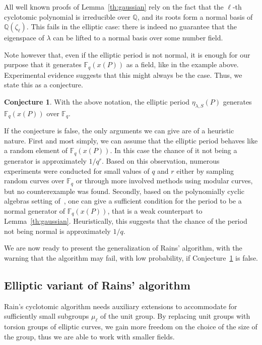 \documentclass{mcom-l}
\theoremstyle{plain}
\theoremstyle{definition}
\newtheorem{conjecture}[theorem]{Conjecture}
\newcommand{\Q}{\ensuremath{\mathbb{Q}}}
\newcommand{\F}{\ensuremath{\mathbb{F}}}
\newcounter{algorithm}
\begin{document}
All well known proofs of Lemma~\ref{th:gaussian} rely on the fact that
the $\ell$-th cyclotomic polynomial is irreducible over $\Q$, and its
roots form a normal basis of $\Q(\zeta_\ell)$. %
This fails in the elliptic case: there is indeed no guarantee that the
eigenspace of $\lambda$ can be lifted to a normal basis over some
number field.

Note however that, even if the elliptic period is not normal, it is
enough for our purpose that it generates $\F_q(x(P))$ as a field, like
in the example above.
Experimental evidence suggests that this might always be the
case.
Thus, we state this as a conjecture.

\begin{conjecture}
\label{conj:ellperiods}
With the above notation, the elliptic period $\eta_{\lambda,S}(P)$
generates $\F_q(x(P))$ over $\F_q$.
\end{conjecture}

If the conjecture is false, the only arguments we can give are of a
heuristic nature.
First and most simply, we can assume that the
elliptic period behaves like a random element of $\F_q(x(P))$. In this
case the chance of it not being a generator is approximately
$1/q^r$. %
Based on this observation, numerous experiments
were conducted for small values of $q$ and $r$
either by sampling random curves over $\F_q$
or through more involved methods using modular curves,
but no counterexample was found.
Secondly, based on the polynomially cyclic algebras setting
of~\cite{Mihailescu2010825}, one can give a sufficient
condition for the period to be a normal generator of
$\F_q(x(P))$, that is a weak counterpart to Lemma~\ref{th:gaussian}.
Heuristically, this suggests that the
chance of the period not being normal is approximately $1/q$.

We are now ready to present the generalization of Rains' algorithm,
with the warning that the algorithm may fail, with low probability, if
Conjecture~\ref{conj:ellperiods} is false.



\subsection{Elliptic variant of Rains' algorithm}

Rain's cyclotomic algorithm needs auxiliary extensions to accommodate
for sufficiently small subgroups $\mu_\ell$ of the unit group. By
replacing unit groups with torsion groups of elliptic curves, we gain
more freedom on the choice of the size of the group, thus we are able
to work with smaller fields.  
\end{document}
